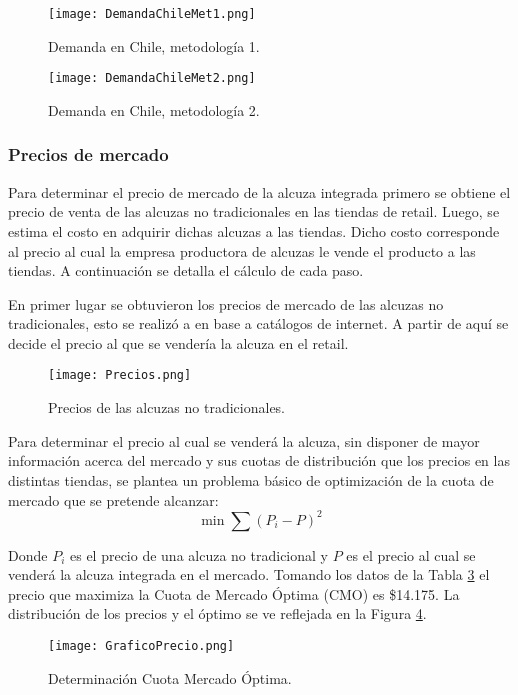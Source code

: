 \begin{figure}[H]
\centering
\texttt{[image: DemandaChileMet1.png]}
\caption{Demanda en Chile, metodología 1.}
\label{DemandaChileMet1}
\end{figure}

\begin{figure}[H]
\centering
\texttt{[image: DemandaChileMet2.png]}
\caption{Demanda en Chile, metodología 2.}
\label{DemandaChileMet2}
\end{figure}

\subsubsection{Precios de mercado}

Para determinar el precio de mercado de la alcuza integrada primero se obtiene el precio de venta de las alcuzas no tradicionales en las tiendas de retail. Luego, se estima el costo en adquirir dichas alcuzas a las tiendas. Dicho costo corresponde al precio al cual la empresa productora de alcuzas le vende el producto a las tiendas. A continuación se detalla el cálculo de cada paso.

En primer lugar se obtuvieron los precios de mercado de las alcuzas no tradicionales, esto se realizó a en base a catálogos de internet.  A partir de aquí se decide el precio al que se vendería la alcuza en el retail.

\begin{figure}[H]
\centering
\texttt{[image: Precios.png]}
\caption{Precios de las alcuzas no tradicionales.}
\label{Precios}
\end{figure}

Para determinar el precio al cual se venderá la alcuza, sin disponer de mayor información acerca del mercado y sus cuotas de distribución que los precios en las distintas tiendas, se plantea un problema básico de optimización de la cuota de mercado que se pretende alcanzar:
\begin{equation*}
\min \sum(P_i-P)^2
\end{equation*}

Donde $P_i$ es el precio de una alcuza no tradicional y $P$ es el precio al cual se venderá la alcuza integrada en el mercado. Tomando los datos de la Tabla \ref{Precios} el precio que maximiza la Cuota de Mercado Óptima (CMO) es \$14.175. La distribución de los precios y el óptimo se ve reflejada en la Figura \ref{GraficoPrecio}.

\begin{figure}[H]
\centering
\texttt{[image: GraficoPrecio.png]}
\caption{Determinación Cuota Mercado Óptima.}
\label{GraficoPrecio}
\end{figure}

